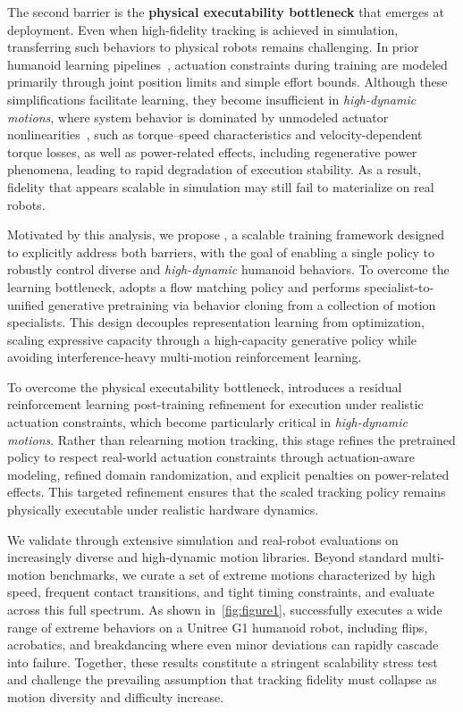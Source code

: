 The second barrier is the \textbf{physical executability bottleneck} that emerges at deployment. Even when high-fidelity tracking is achieved in simulation, transferring such behaviors to physical robots remains challenging. In prior humanoid learning pipelines~\cite{he2024omnih2o,zhang2025track,chen2025gmt,ji2024exbody2,luo2025sonic,ze2025twist,liao2025beyondmimic,he2025asap,li2025clone,xie2025kungfubot}, actuation constraints during training are modeled primarily through joint position limits and simple effort bounds. Although these simplifications facilitate learning, they become insufficient in \emph{high-dynamic motions}, where system behavior is dominated by unmodeled actuator nonlinearities~\cite{shin2023actuator}, such as torque--speed characteristics and velocity-dependent torque losses, as well as power-related effects, including regenerative power phenomena, leading to rapid degradation of execution stability. As a result, fidelity that appears scalable in simulation may still fail to materialize on real robots.

Motivated by this analysis, we propose \model, a scalable training framework designed to explicitly address both barriers, with the goal of enabling a single
policy to robustly control diverse and \emph{high-dynamic} humanoid behaviors. To overcome the learning bottleneck, \model adopts a flow matching policy and performs specialist-to-unified generative pretraining via behavior cloning from a collection of motion specialists. This design decouples representation learning from optimization, scaling expressive capacity through a high-capacity generative policy while avoiding interference-heavy multi-motion reinforcement learning.

To overcome the physical executability bottleneck, \model introduces a residual reinforcement learning post-training refinement for execution under realistic actuation constraints, which become particularly critical in
\emph{high-dynamic motions}. Rather than relearning motion tracking, this stage refines the pretrained policy to respect real-world actuation constraints through actuation-aware modeling, refined domain randomization, and explicit penalties on power-related effects. This targeted refinement ensures that the scaled tracking policy remains physically executable under realistic hardware dynamics.

We validate \model through extensive simulation and real-robot evaluations on
increasingly diverse and high-dynamic motion libraries.
Beyond standard multi-motion benchmarks, we curate a set of extreme motions
characterized by high speed, frequent contact transitions, and tight timing constraints,
and evaluate \model across this full spectrum.
As shown in~\cref{fig:figure1}, \model successfully executes a wide range of
extreme behaviors on a Unitree G1 humanoid robot, including flips, acrobatics,
and breakdancing where even minor deviations can rapidly cascade into failure.
Together, these results constitute a stringent scalability stress test and challenge the prevailing assumption that tracking fidelity must collapse as motion diversity and difficulty increase.

